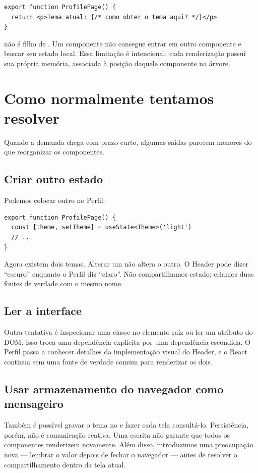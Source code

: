 \begin{lstlisting}
export function ProfilePage() {
  return <p>Tema atual: {/* como obter o tema aqui? */}</p>
}
\end{lstlisting}

 não é filho de . Um componente não consegue
entrar em outro componente e buscar seu estado local. Essa limitação é
intencional: cada renderização possui sua própria memória, associada à posição
daquele componente na árvore.

\section{Como normalmente tentamos resolver}

Quando a demanda chega com prazo curto, algumas saídas parecem menores do que
reorganizar os componentes.

\subsection{Criar outro estado}

Podemos colocar outro  no Perfil:

\begin{lstlisting}
export function ProfilePage() {
  const [theme, setTheme] = useState<Theme>('light')
  // ...
}
\end{lstlisting}

Agora existem dois temas. Alterar um não altera o outro. O Header pode dizer
``escuro'' enquanto o Perfil diz ``claro''. Não compartilhamos estado; criamos
duas fontes de verdade com o mesmo nome.

\subsection{Ler a interface}

Outra tentativa é inspecionar uma classe no elemento raiz ou ler um atributo do
DOM. Isso troca uma dependência explícita por uma dependência escondida. O
Perfil passa a conhecer detalhes da implementação visual do Header, e o React
continua sem uma fonte de verdade comum para renderizar os dois.

\subsection{Usar armazenamento do navegador como mensageiro}

Também é possível gravar o tema no  e fazer cada tela
consultá-lo. Persistência, porém, não é comunicação reativa. Uma escrita não
garante que todos os componentes renderizem novamente. Além disso, introduzimos
uma preocupação nova --- lembrar o valor depois de fechar o navegador --- antes
de resolver o compartilhamento dentro da tela atual.

